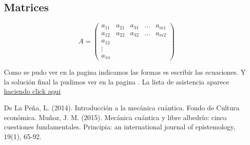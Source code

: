 \documentclass[12pt,a4paper]{article}
\begin{document}
\subsection*{Matrices}
$$A=\begin{pmatrix}
a_{11} & a_{21} & a_{31} & \hdots & a_{m1} \\
a_{12} & a_{22} & a_{32} & \hdots & a_{m2} \\
a_{13} \\
\vdots \\
a_{1n}
\end{pmatrix}$$

Como se pudo ver en la pagina \pageref{formulas} indicamos las formas es escribir las ecuaciones. Y la solución final la pudimos ver en la pagina \pageref{Atmos}. La lista de asistencia aparece \href{https://forms.gle/84VyN2QJq7twTHH87}{haciendo click aqui}

\renewcommand{\refname}{Bibliografía}
\begin{thebibliography}{2}
 De La Peña, L. (2014). Introducción a la mecánica cuántica. Fondo de Cultura económica.
 Muñoz, J. M. (2015). Mecánica cuántica y libre albedrío: cinco cuestiones fundamentales. Principia: an international journal of epistemology, 19(1), 65-92.
\end{thebibliography}
\end{document}
